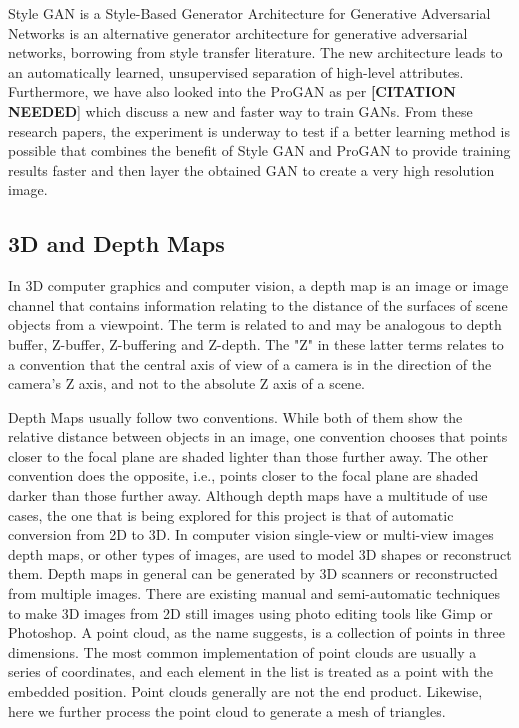 \documentclass{article}
\begin{document}
Style GAN is a Style-Based Generator Architecture for Generative Adversarial Networks is an alternative generator architecture for generative adversarial networks, borrowing from style transfer literature. The new architecture leads to an automatically learned, unsupervised separation of high-level attributes.
Furthermore, we have also looked into the ProGAN as per \textbf{[CITATION NEEDED}] which discuss a new and faster way to train GANs.
From these research papers, the experiment is underway to test if a better learning method is possible that combines the benefit of Style GAN and ProGAN to provide training results faster and then layer the obtained GAN to create a very high resolution image.

\subsection{3D and Depth Maps}

In 3D computer graphics and computer vision, a depth map is an image or image channel that contains information relating to the distance of the surfaces of scene objects from a viewpoint. The term is related to and may be analogous to depth buffer, Z-buffer, Z-buffering and Z-depth. The "Z" in these latter terms relates to a convention that the central axis of view of a camera is in the direction of the camera's Z axis, and not to the absolute Z axis of a scene.

Depth Maps usually follow two conventions. While both of them show the relative distance between objects in an image, one convention chooses that points closer to the focal plane are shaded lighter than those further away. The other convention does the opposite, i.e., points closer to the focal plane are shaded darker than those further away.
Although depth maps have a multitude of use cases, the one that is being explored for this project is that of automatic conversion from 2D to 3D. In computer vision single-view or multi-view images depth maps, or other types of images, are used to model 3D shapes or reconstruct them. Depth maps in general can be generated by 3D scanners or reconstructed from multiple images.
There are existing manual and semi-automatic techniques to make 3D images from 2D still images using photo editing tools like Gimp or Photoshop.
A point cloud, as the name suggests, is a collection of points in three dimensions. The most common implementation of point clouds are usually a series of coordinates, and each element in the list is treated as a point with the embedded position. Point clouds generally are not the end product. Likewise, here we further process the point cloud to generate a mesh of triangles.
\end{document}
